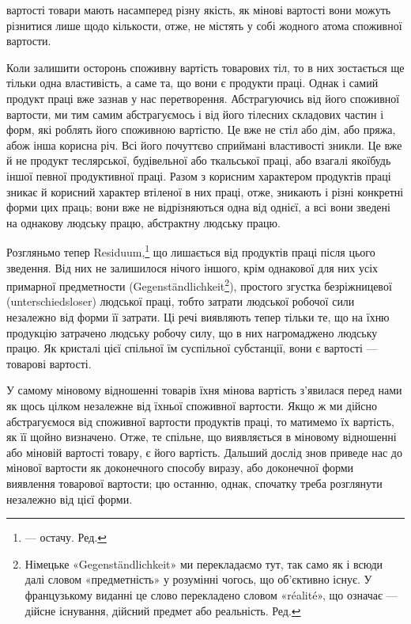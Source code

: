 \parcont{}  %
вартості товари мають насамперед різну якість, як мінові вартості
вони можуть різнитися лише щодо кількости, отже, не
містять у собі жодного атома споживної вартости.

Коли залишити осторонь споживну вартість товарових тіл,
то в них зостається ще тільки одна властивість, а саме та, що
вони є продукти праці. Однак і самий продукт праці вже зазнав
у нас перетворення. Абстрагуючись від його споживної вартости,
ми тим самим абстрагуємось і від його тілесних складових частин
і форм, які роблять його споживною вартістю. Це вже не стіл або
дім, або пряжа, абож інша корисна річ. Всі його почуттєво сприймані
властивості зникли. Це вже й не продукт теслярської, будівельної
або ткальської праці, або взагалі якоїбудь іншої певної
продуктивної праці. Разом з корисним характером продуктів
праці зникає й корисний характер втіленої в них праці, отже,
зникають і різні конкретні форми цих праць; вони вже не відрізняються
одна від однієї, а всі вони зведені на однакову людську
працю, абстрактну людську працю.

Розгляньмо тепер Residuum,\footnote*{
— остачу. Ред.
} що лишається від продуктів
праці після цього зведення. Від них не залишилося нічого іншого,
крім однакової для них усіх примарної предметности (Gegenständlichkeit\footnote*{
Німецьке «Gegenständlichkeit» ми перекладаємо тут, так само як
і всюди далі словом «предметність» у розумінні чогось, що об’єктивно
існує. У французькому виданні це слово перекладено словом «réalité»,
що означає — дійсне існування, дійсний предмет або реальність. Ред.
}),
простого згустка безріжницевої (unterschiedsloser)
людської праці, тобто затрати людської робочої сили незалежно
від форми її затрати. Ці речі виявляють тепер тільки те,
що на їхню продукцію затрачено людську робочу силу, що в них
нагромаджено людську працю. Як кристалі цієї спільної їм суспільної
субстанції, вони є вартості — товарові вартості.

У самому міновому відношенні товарів їхня мінова вартість
з’явилася перед нами як щось цілком незалежне від їхньої споживної
вартости. Якщо ж ми дійсно абстрагуємося від споживної
вартости продуктів праці, то матимемо їх вартість, як її щойно
визначено. Отже, те спільне, що виявляється в міновому відношенні
або міновій вартості товару, є його вартість. Дальший дослід
знов приведе нас до мінової вартости як доконечного способу
виразу, або доконечної форми виявлення товарової вартости; цю
останню, однак, спочатку треба розглянути незалежно від цієї форми.

